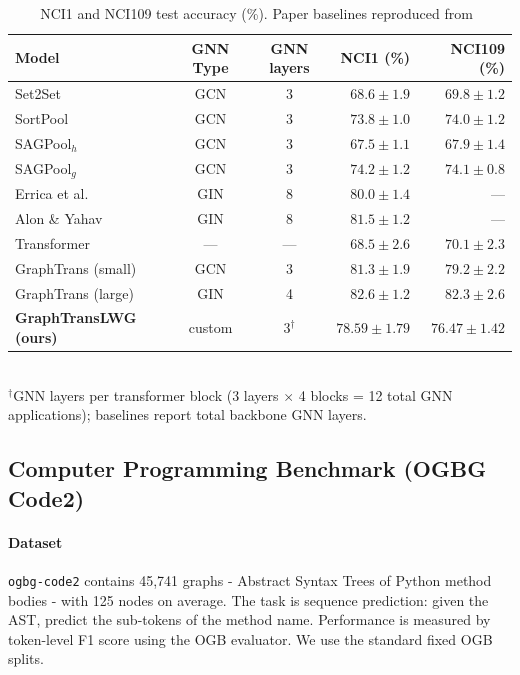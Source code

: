\documentclass[11pt]{article}
\begin{document}
\begin{table}[h]
\centering
\caption{NCI1 and NCI109 test accuracy (\%). Paper baselines reproduced from~\cite{wu2022representinglongrangecontextgraph} }
\label{tab:nci}
\begin{tabular}{lccrr}
\toprule
\textbf{Model} & \textbf{GNN Type} & \textbf{GNN layers} & \textbf{NCI1 (\%)} & \textbf{NCI109 (\%)} \\
\midrule
Set2Set~\cite{vinyals2016ordermatterssequencesequence}   & GCN & 3 & $68.6\pm1.9$ & $69.8\pm1.2$ \\
SortPool~\cite{10.5555/3504035.3504579}      & GCN & 3 & $73.8\pm1.0$ & $74.0\pm1.2$ \\
SAGPool$_h$~\cite{pmlr-v97-lee19c}    & GCN & 3 & $67.5\pm1.1$ & $67.9\pm1.4$ \\
SAGPool$_g$~\cite{pmlr-v97-lee19c}    & GCN & 3 & $74.2\pm1.2$ & $74.1\pm0.8$ \\
\midrule
Errica et al.~\cite{Errica2020A}     & GIN & 8 & $80.0\pm1.4$ & --- \\
Alon \& Yahav~\cite{alon2021on} & GIN & 8 & $81.5\pm1.2$ & --- \\
\midrule
Transformer~\cite{NIPS2017_3f5ee243}      & --- & --- & $68.5\pm2.6$ & $70.1\pm2.3$ \\
\midrule
GraphTrans (small)~\cite{wu2022representinglongrangecontextgraph} & GCN & 3   & $81.3\pm1.9$ & $79.2\pm2.2$ \\
GraphTrans (large)~\cite{wu2022representinglongrangecontextgraph} & GIN & 4   & $\mathbf{82.6\pm1.2}$ & $\mathbf{82.3\pm2.6}$ \\
\midrule
\textbf{GraphTransLWG (ours)} & custom & $3^\dagger$
  & $\mathbf{78.59\pm1.79}$ & $\mathbf{76.47\pm1.42}$ \\
\bottomrule
\end{tabular}
\smallskip\\
{\footnotesize $^\dagger$GNN layers per transformer block (3 layers $\times$ 4 blocks = 12 total GNN applications); baselines report total backbone GNN layers.}
\end{table}

\subsection{Computer Programming Benchmark (\textsf{OGBG Code2})}

\paragraph{Dataset}
\texttt{ogbg-code2} contains 45{,}741 graphs - Abstract Syntax Trees of Python method bodies - with 125 nodes on average. The task is sequence prediction: given the AST, predict the sub-tokens of the method name. Performance is measured by token-level F1 score using the OGB evaluator. We use the standard fixed OGB splits.
\end{document}
